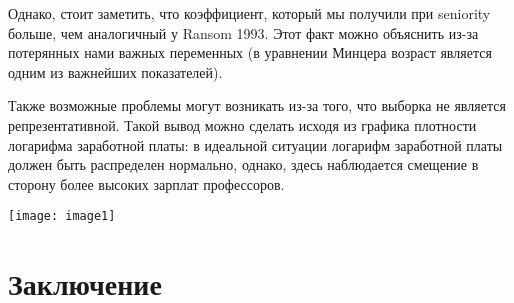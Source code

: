 \documentclass[a4paper, 12pt]{article}
\theoremstyle{definition}
\theoremstyle{plain}
\begin{document}
Однако, стоит заметить, что коэффициент, который мы получили при seniority больше, чем аналогичный у Ransom 1993. Этот факт можно объяснить из-за потерянных нами важных переменных (в уравнении Минцера возраст является одним из важнейших показателей).

Также возможные проблемы могут возникать из-за того, что выборка не является репрезентативной. Такой вывод можно сделать исходя из графика плотности логарифма заработной платы: в идеальной ситуации логарифм заработной платы должен быть распределен нормально, однако, здесь наблюдается смещение в сторону более высоких зарплат профессоров.


\begin{center}
\texttt{[image: image1]}
\end{center}

\section{Заключение}

\renewcommand{\refname}{Список литературы}

 
\end{document}
